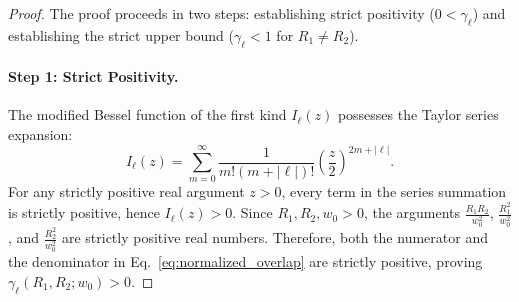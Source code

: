 \documentclass[11pt,a4paper]{article}
\begin{document}
\begin{proof}
The proof proceeds in two steps: establishing strict positivity ($0 < \gamma_\ell$) and establishing the strict upper bound ($\gamma_\ell < 1$ for $R_1 \neq R_2$).

\paragraph{Step 1: Strict Positivity.}
The modified Bessel function of the first kind $I_\ell(z)$ possesses the Taylor series expansion:
\begin{equation}
I_\ell(z) = \sum_{m=0}^\infty \frac{1}{m! (m + |\ell|)!} \left( \frac{z}{2} \right)^{2m + |\ell|}.
\label{eq:bessel_taylor_series}
\end{equation}
For any strictly positive real argument $z > 0$, every term in the series summation is strictly positive, hence $I_\ell(z) > 0$. Since $R_1, R_2, w_0 > 0$, the arguments $\frac{R_1 R_2}{w_0^2}$, $\frac{R_1^2}{w_0^2}$, and $\frac{R_2^2}{w_0^2}$ are strictly positive real numbers. Therefore, both the numerator and the denominator in Eq.~\eqref{eq:normalized_overlap} are strictly positive, proving $\gamma_\ell(R_1, R_2; w_0) > 0$.


\end{proof}
\end{document}
